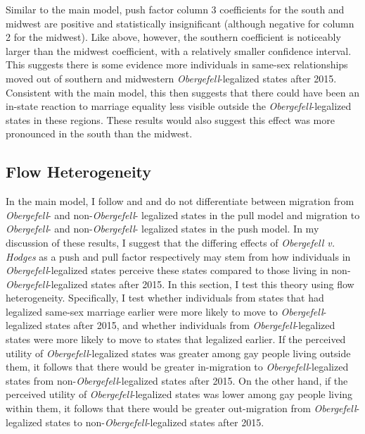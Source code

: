 \documentclass[12pt,letterpaper]{article}
\begin{document}
\FloatBarrier
Similar to the main model, push factor column 3 coefficients for the south and midwest are positive and statistically insignificant (although negative for column 2 for the midwest). Like above, however, the southern coefficient is noticeably larger than the midwest coefficient, with a relatively smaller confidence interval. This suggests there is some evidence more individuals in same-sex relationships moved out of southern and midwestern \textit{Obergefell}-legalized states after 2015. Consistent with the main model, this then suggests that there could have been an in-state reaction to marriage equality less visible outside the \textit{Obergefell}-legalized states in these regions. These results would also suggest this effect was more pronounced in the south than the midwest.

\FloatBarrier
\subsection{Flow Heterogeneity}

In the main model, I follow \citet{1} and \citet{12} and do not differentiate between migration from \textit{Obergefell}- and non-\textit{Obergefell}- legalized states in the pull model and migration to \textit{Obergefell}- and non-\textit{Obergefell}- legalized states in the push model.  In my discussion of these results, I suggest that the differing effects of \textit{Obergefell v. Hodges} as a push and pull factor respectively may stem from how individuals in \textit{Obergefell}-legalized states perceive these states compared to those living in non-\textit{Obergefell}-legalized states after 2015.  In this section, I test this theory using flow heterogeneity.  Specifically, I test whether individuals from states that had legalized same-sex marriage earlier were more likely to move to \textit{Obergefell}-legalized states after 2015, and whether individuals from \textit{Obergefell}-legalized states were more likely to move to states that legalized earlier. If the perceived utility of \textit{Obergefell}-legalized states was greater among gay people living outside them, it follows that there would be greater in-migration to \textit{Obergefell}-legalized states from non-\textit{Obergefell}-legalized states after 2015. On the other hand, if the perceived utility of \textit{Obergefell}-legalized states was lower among gay people living within them, it follows that there would be greater out-migration from \textit{Obergefell}-legalized states to non-\textit{Obergefell}-legalized states after 2015.
\end{document}
